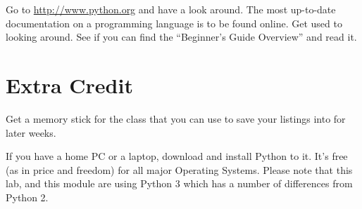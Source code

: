 \documentclass[12pt,oneside]{cttutorial}
\begin{document}
Go to \url{http://www.python.org} and have a look around. The most up-to-date documentation on a programming language is to be found online.
Get used to looking around. See if you can find the ``Beginner's Guide Overview'' and read it.

\section{Extra Credit}

Get a memory stick for the class that you can use to save your listings into for later weeks.

If you have a home PC or a laptop, download and install Python to it. It's free (as in price and freedom) for all major Operating Systems.
Please note that this lab, and this module are using Python 3 which has a number of differences from Python 2.
\end{document}
